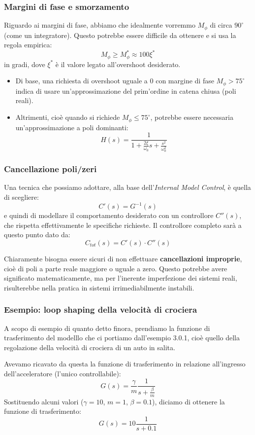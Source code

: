 \documentclass[a4paper,11pt]{article}
\begin{document}
\subsubsection{Margini di fase e smorzamento}
Riguardo ai margini di fase, abbiamo che idealmente vorremmo $M_\phi$ di circa $90^\circ$ (come un integratore).
Questo potrebbe essere difficile da ottenere e si usa la regola empirica:
$$
M_\phi \geq M_\phi^* \approx 100 \xi^*
$$
in gradi, dove $\xi^*$ è il valore legato all'overshoot desiderato. 

\begin{itemize}
	\item Di base, una richiesta di overshoot uguale a 0 con margine di fase $M_\phi > 75^\circ$ indica di usare un'approssimazione del prim'ordine in catena chiusa (poli reali).
	\item Altrimenti, cioè quando si richiede $M_\phi \leq 75^\circ$, potrebbe essere necessaria un'approssimazione a poli dominanti:
		$$
		H(s) = \frac{1}{1 + \frac{2\xi}{\omega_0} s + \frac{s^2}{\omega_0^2}}
		$$
\end{itemize}

\subsubsection{Cancellazione poli/zeri}
Una tecnica che possiamo adottare, alla base dell'\textit{Internal Model Control}, è quella di scegliere:
$$
C'(s) = G^{-1}(s)
$$
e quindi di modellare il comportamento desiderato con un controllore $C''(s)$, che rispetta effettivamente le specifiche richieste.
Il controllore completo sarà a questo punto dato da:
$$
C_{tot}(s) = C'(s) \cdot C''(s)
$$

Chiaramente bisogna essere sicuri di non effettuare \textbf{cancellazioni improprie}, cioè di poli a parte reale maggiore o uguale a zero.
Questo potrebbe avere significato matematicamente, ma per l'inerente imperfezione dei sistemi reali, risulterebbe nella pratica in sistemi irrimediabilmente instabili.

\subsubsection{Esempio: loop shaping della velocità di crociera}
A scopo di esempio di quanto detto finora, prendiamo la funzione di trasferimento del modelllo che ci portiamo dall'esempio 3.0.1, cioè quello della regolazione della velocità di crociera di un auto in salita.

Avevamo ricavato da questa la funzione di trasferimento in relazione all'ingresso dell'acceleratore (l'unico controllabile):
$$
G(s) = \frac{\gamma}{m} \frac{1}{s + \frac{\beta}{m}} 
$$
Sostituendo alcuni valori ($\gamma = 10$, $m = 1$, $\beta = 0.1$), diciamo di ottenere la funzione di trasferimento:
$$
G(s) = 10 \frac{1}{s + 0.1}
$$
\end{document}
